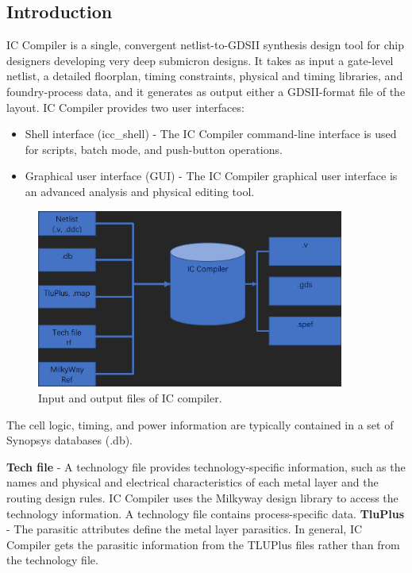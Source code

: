 \documentclass[a4paper,12pt,twoside]{article}
\begin{document}
\subsection{Introduction}
IC Compiler is a single, convergent netlist-to-GDSII synthesis design tool for chip designers developing very deep submicron designs. It takes as input a gate-level netlist, a detailed floorplan, timing constraints, physical and timing libraries, and foundry-process data, and it generates as output either a GDSII-format file of the layout.
IC Compiler provides two user interfaces:
\begin{itemize}
    \item Shell interface (icc\_shell) - The IC Compiler command-line interface is used for scripts, batch mode, and push-button operations.
    \item Graphical user interface (GUI) - The IC Compiler graphical user interface is an advanced analysis and physical editing tool.
\end{itemize}
\begin{figure}[H]
    \centering
    \includegraphics[width=0.9\textwidth]{images/1.png}
    \caption{Input and output files of IC compiler.}
\end{figure}
The cell logic, timing, and power information are typically contained in a set of Synopsys databases (.db).

\textbf{Tech file} - A technology file provides technology-specific information, such as the names and physical and electrical characteristics of each metal layer and the routing design rules. IC Compiler uses the Milkyway design library to access the technology information. A technology file contains process-specific data.
\textbf{TluPlus} - The parasitic attributes define the metal layer parasitics. In general, IC Compiler gets the parasitic information from the TLUPlus files rather than from the technology file.
\end{document}
